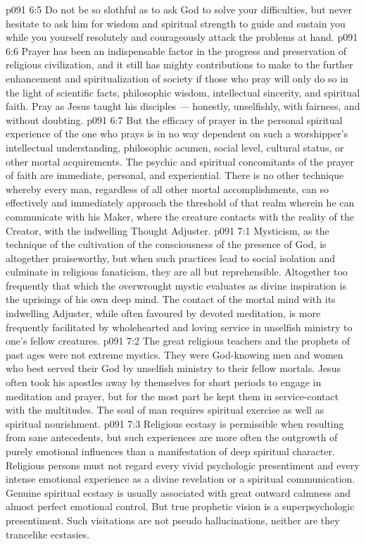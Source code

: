 \vs p091 6:5 \pc Do not be so slothful as to ask God to solve your difficulties, but never hesitate to ask him for wisdom and spiritual strength to guide and sustain you while you yourself resolutely and courageously attack the problems at hand.
\vs p091 6:6 \pc Prayer has been an indispensable factor in the progress and preservation of religious civilization, and it still has mighty contributions to make to the further enhancement and spiritualization of society if those who pray will only do so in the light of scientific facts, philosophic wisdom, intellectual sincerity, and spiritual faith. Pray as Jesus taught his disciples --- honestly, unselfishly, with fairness, and without doubting.
\vs p091 6:7 But the efficacy of prayer in the personal spiritual experience of the one who prays is in no way dependent on such a worshipper’s intellectual understanding, philosophic acumen, social level, cultural status, or other mortal acquirements. The psychic and spiritual concomitants of the prayer of faith are immediate, personal, and experiential. There is no other technique whereby every man, regardless of all other mortal accomplishments, can so effectively and immediately approach the threshold of that realm wherein he can communicate with his Maker, where the creature contacts with the reality of the Creator, with the indwelling Thought Adjuster.
\vs p091 7:1 Mysticism, as the technique of the cultivation of the consciousness of the presence of God, is altogether praiseworthy, but when such practices lead to social isolation and culminate in religious fanaticism, they are all but reprehensible. Altogether too frequently that which the overwrought mystic evaluates as divine inspiration is the uprisings of his own deep mind. The contact of the mortal mind with its indwelling Adjuster, while often favoured by devoted meditation, is more frequently facilitated by wholehearted and loving service in unselfish ministry to one’s fellow creatures.
\vs p091 7:2 The great religious teachers and the prophets of past ages were not extreme mystics. They were God\hyp{}knowing men and women who best served their God by unselfish ministry to their fellow mortals. Jesus often took his apostles away by themselves for short periods to engage in meditation and prayer, but for the most part he kept them in service\hyp{}contact with the multitudes. The soul of man requires spiritual exercise as well as spiritual nourishment.
\vs p091 7:3 Religious ecstasy is permissible when resulting from sane antecedents, but such experiences are more often the outgrowth of purely emotional influences than a manifestation of deep spiritual character. Religious persons must not regard every vivid psychologic presentiment and every intense emotional experience as a divine revelation or a spiritual communication. Genuine spiritual ecstasy is usually associated with great outward calmness and almost perfect emotional control. But true prophetic vision is a superpsychologic presentiment. Such visitations are not pseudo hallucinations, neither are they trancelike ecstasies.
